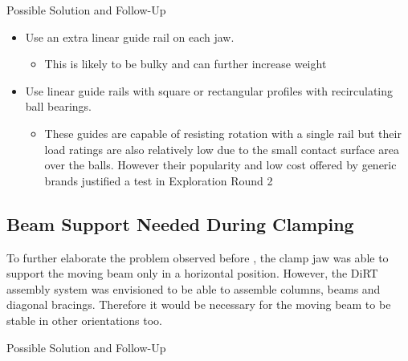 Possible Solution and Follow-Up
\begin{itemize}
    \item Use an extra linear guide rail on each jaw.
    \begin{itemize}
        \item This is likely to be bulky and can further increase weight
    \end{itemize}
    \item Use linear guide rails with square or rectangular profiles with recirculating ball bearings.
    \begin{itemize}
        \item These guides are capable of resisting rotation with a single rail but their load ratings are also relatively low due to the small contact surface area over the balls. However their popularity and low cost offered by generic brands justified a test in Exploration Round 2 
    \end{itemize}
\end{itemize}
        
\subsection{Beam Support Needed During Clamping}
\label{subsection:exploration-1-beam-support-needed-during-clamping}

To further elaborate the problem observed before , the clamp jaw was able to support the moving beam only in a horizontal position. However, the DiRT assembly system was envisioned to be able to assemble columns, beams and diagonal bracings. Therefore it would be necessary for the moving beam to be stable in other orientations too.

Possible Solution and Follow-Up

